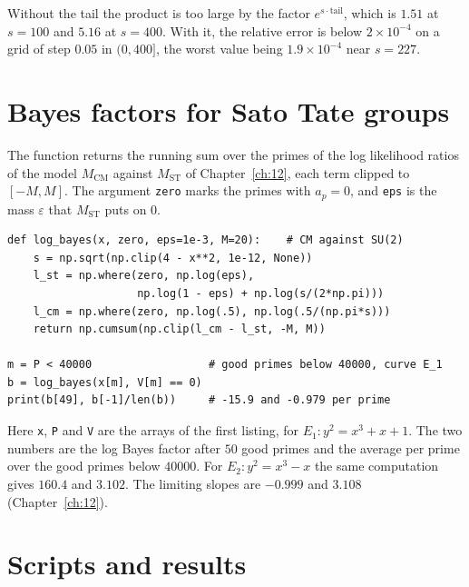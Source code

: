 Without the tail the product is too large by the factor $e^{s\cdot\mathrm{tail}}$, which is $1.51$ at $s=100$ and $5.16$ at $s=400$. With it, the relative error is below $2\times10^{-4}$ on a grid of step $0.05$ in $(0,400]$, the worst value being $1.9\times10^{-4}$ near $s=227$.

\section{Bayes factors for Sato Tate groups}\label{sec:B:bayes}

The function returns the running sum over the primes of the log likelihood ratios of the model $M_{\mathrm{CM}}$ against $M_{\mathrm{ST}}$ of Chapter~\ref{ch:12}, each term clipped to $[-M,M]$. The argument \texttt{zero} marks the primes with $a_p=0$, and \texttt{eps} is the mass $\varepsilon$ that $M_{\mathrm{ST}}$ puts on $0$.

{\footnotesize
\begin{verbatim}
def log_bayes(x, zero, eps=1e-3, M=20):    # CM against SU(2)
    s = np.sqrt(np.clip(4 - x**2, 1e-12, None))
    l_st = np.where(zero, np.log(eps),
                    np.log(1 - eps) + np.log(s/(2*np.pi)))
    l_cm = np.where(zero, np.log(.5), np.log(.5/(np.pi*s)))
    return np.cumsum(np.clip(l_cm - l_st, -M, M))

m = P < 40000                  # good primes below 40000, curve E_1
b = log_bayes(x[m], V[m] == 0)
print(b[49], b[-1]/len(b))     # -15.9 and -0.979 per prime
\end{verbatim}
}

Here \texttt{x}, \texttt{P} and \texttt{V} are the arrays of the first listing, for $E_1:y^2=x^3+x+1$. The two numbers are the log Bayes factor after $50$ good primes and the average per prime over the good primes below $40000$. For $E_2:y^2=x^3-x$ the same computation gives $160.4$ and $3.102$. The limiting slopes are $-0.999$ and $3.108$ (Chapter~\ref{ch:12}).

\section{Scripts and results}\label{sec:B:scripts}

